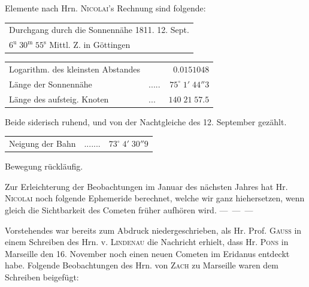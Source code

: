 Elemente nach Hrn. \textsc{Nicolai}'s Rechnung sind folgende:

\begin{center}\fontsize{10}{12}\selectfont\setlength{\tabcolsep}{4pt}\renewcommand{\arraystretch}{1.15}\begin{tabular}{l}
Durchgang durch die Sonnennähe 1811. 12. Sept.\\
\quad $6^{\mathrm u}\;30^{\mathrm m}\;55^{\mathrm s}$ Mittl. Z. in Göttingen\\
\end{tabular}\end{center}
\begin{center}\fontsize{10}{12}\selectfont\setlength{\tabcolsep}{3pt}\renewcommand{\arraystretch}{1.15}\begin{tabular}{llr}
Logarithm. des kleinsten Abstandes &  & $0.0151048$\\
Länge der Sonnennähe & .\;.\;.\;.\;. & $75^\circ\;1'\;44''3$\\
Länge des aufsteig. Knoten & .\;.\;. & $140\;21\;57.5$\\
\end{tabular}\end{center}
\noindent Beide siderisch ruhend, und von der Nachtgleiche des 12. September gezählt.
\begin{center}\fontsize{10}{12}\selectfont\setlength{\tabcolsep}{3pt}\renewcommand{\arraystretch}{1.15}\begin{tabular}{llr}
Neigung der Bahn & .\;.\;.\;.\;.\;.\;. & $73^\circ\;4'\;30''9$\\
\end{tabular}\end{center}
\noindent Bewegung rückläufig.

\par\indent Zur Erleichterung der Beobachtungen im Januar des nächsten Jahres hat Hr. \textsc{Nicolai} noch folgende Ephemeride berechnet, welche wir ganz hiehersetzen, wenn gleich die Sichtbarkeit des Cometen früher aufhören wird. \mbox{--- --- ---}


\par\indent Vorstehendes war bereits zum Abdruck niedergeschrieben, als Hr. Prof. \textsc{Gauss} in einem Schreiben des Hrn. v. \textsc{Lindenau} die Nachricht erhielt, dass Hr. \textsc{Pons} in Marseille den 16. November noch einen neuen Cometen im Eridanus entdeckt habe. Folgende Beobachtungen des Hrn. von \textsc{Zach} zu Marseille waren dem Schreiben beigefügt:

